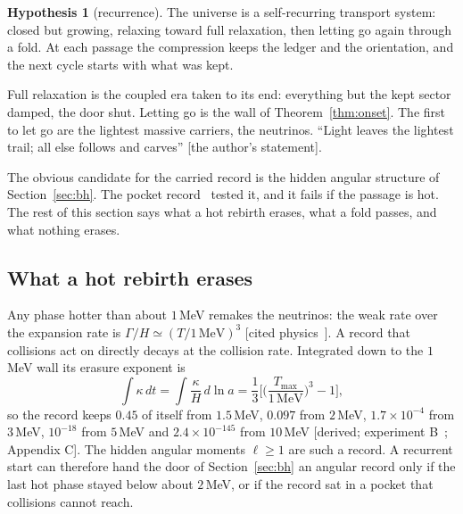 \documentclass[11pt]{article}
\theoremstyle{definition}\newtheorem{hypothesis}{Hypothesis}\newtheorem{prediction}{Prediction}
\theoremstyle{remark}\newtheorem{remark}[theorem]{Remark}
\newcommand{\grade}[1]{\textsf{\small[#1]}}
\begin{document}
\begin{hypothesis}[recurrence]\label{hyp:cycle}
The universe is a self-recurring transport system: closed but growing, relaxing toward full relaxation, then letting go again through a fold. At each passage the compression keeps the ledger and the orientation, and the next cycle starts with what was kept.
\end{hypothesis}
Full relaxation is the coupled era taken to its end: everything but the kept sector damped, the door shut. Letting go is the wall of Theorem~\ref{thm:onset}. The first to let go are the lightest massive carriers, the neutrinos. ``Light leaves the lightest trail; all else follows and carves'' \grade{the author's statement}.

The obvious candidate for the carried record is the hidden angular structure of Section~\ref{sec:bh}. The pocket record~\cite{Pocket} tested it, and it fails if the passage is hot. The rest of this section says what a hot rebirth erases, what a fold passes, and what nothing erases.

\subsection{What a hot rebirth erases}
Any phase hotter than about $1$\,MeV remakes the neutrinos: the weak rate over the expansion rate is $\Gamma/H\simeq(T/1\,\mathrm{MeV})^3$ \grade{cited physics~\cite{Dolgov}}. A record that collisions act on directly decays at the collision rate. Integrated down to the $1$\,MeV wall its erasure exponent is
\begin{equation}
\int\kappa\,dt=\int\frac{\kappa}{H}\,d\ln a=\frac13\Big[\Big(\frac{T_{\max}}{1\,\mathrm{MeV}}\Big)^3-1\Big],
\end{equation}
so the record keeps $0.45$ of itself from $1.5$\,MeV, $0.097$ from $2$\,MeV, $1.7\times10^{-4}$ from $3$\,MeV, $10^{-18}$ from $5$\,MeV and $2.4\times10^{-145}$ from $10$\,MeV \grade{derived; experiment B~\cite{Pocket}; Appendix C}. The hidden angular moments $\ell\ge1$ are such a record. A recurrent start can therefore hand the door of Section~\ref{sec:bh} an angular record only if the last hot phase stayed below about $2$\,MeV, or if the record sat in a pocket that collisions cannot reach.
\end{document}
